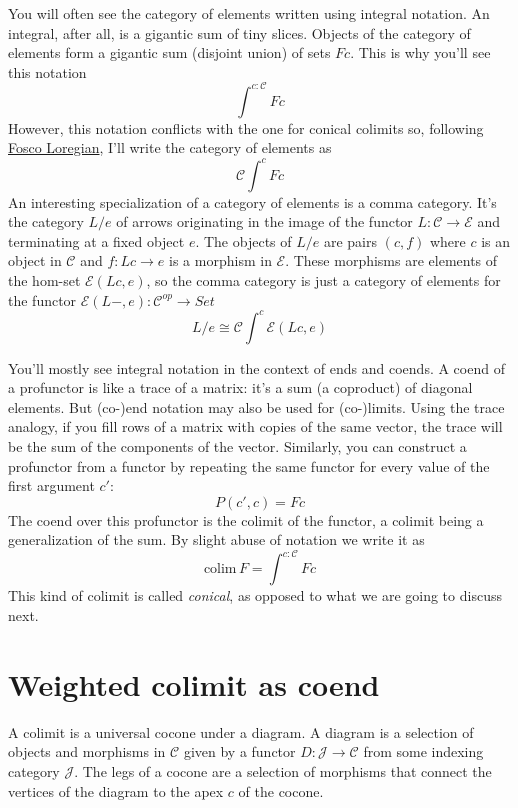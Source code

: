 \documentclass[11pt]{amsart}
\begin{document}
You will often see the category of elements written using integral notation. An integral, after all, is a gigantic sum of tiny slices. Objects of the category of elements form a gigantic sum (disjoint union) of sets $F c$. This is why you'll see this notation
\[\int^{c \colon \mathcal{C}} F c\]
However, this notation conflicts with the one for conical colimits so, following \href{https://arxiv.org/abs/1501.02503}{Fosco Loregian}, I'll write the category of elements as
\[\mathcal{C}\int^{c} F c\]
An interesting specialization of a category of elements is a comma category. It's the category $L/e$ of arrows originating in the image of the functor $L \colon \mathcal{C} \to \mathcal{E}$ and terminating at a fixed object $e$. The objects of $L/e$ are pairs $(c, f)$ where $c$ is an object in $\mathcal{C}$ and $f \colon L c \to e$ is a morphism in $\mathcal{E}$. These morphisms are elements of the hom-set $\mathcal{E}(L c , e)$, so the comma category is just a category of elements for the functor $\mathcal{E}(L-, e) \colon \mathcal{C}^{op} \to Set$
\[L/e \cong \mathcal{C}\int^{c} \mathcal{E}(L c, e)\]

You'll mostly see integral notation in the context of ends and coends. A coend of a profunctor is like a trace of a matrix: it's a sum (a coproduct) of diagonal elements. But (co-)end notation may also be used for (co-)limits. Using the trace analogy, if you fill rows of a matrix with copies of the same vector, the trace will be the sum of the components of the vector. Similarly, you can construct a profunctor from a functor by repeating the same functor for every value of the first argument $c'$:
\[ P(c', c) = F c\]
The coend over this profunctor is the colimit of the functor, a colimit being a generalization of the sum. By slight abuse of notation we write it as
\[ \mbox{colim}\, F = \int^{c \colon \mathcal{C}} F c \]
This kind of colimit is called \emph{conical}, as opposed to what we are going to discuss next.
\section{Weighted colimit as coend}
A colimit is a universal cocone under a diagram. A diagram is a selection of objects and morphisms in $\mathcal{C}$ given by a functor $D \colon \mathcal{J} \to \mathcal{C}$ from some indexing category $\mathcal{J}$. The legs of a cocone are a selection of morphisms that connect the vertices of the diagram to the apex $c$ of the cocone. 
\end{document}
